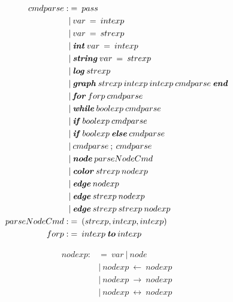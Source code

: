 \documentclass{article}
\begin{document}
\begin{align*}
    cmdparse :&= \: pass \\
    &| \: var \: = \: intexp \\
    &| \: var \: = \: strexp \\
    &| \: \textbf{\textit{int}} \: var \: = \: intexp \\
    &| \: \textbf{\textit{string}} \: var \: = \: strexp \\
    &| \: \textbf{\textit{log}} \: strexp \\
    &| \: \textbf{\textit{graph}} \: strexp \: intexp \: intexp \: cmdparse \: \textbf{\textit{end}}\\
    &| \: \textbf{\textit{for}} \: forp \: cmdparse \\
    &| \: \textbf{\textit{while}} \: boolexp \: cmdparse \\
    &| \: \textbf{\textit{if}} \: boolexp \: cmdparse \\
    &| \: \textbf{\textit{if}} \: boolexp \: \textbf{\textit{else}} \: cmdparse \\
    &| \: cmdparse \: ; \: cmdparse \\
    &| \: \textbf{\textit{node}} \: parseNodeCmd \\
    &| \: \textbf{\textit{color}} \: strexp \: nodexp \\
    &| \: \textbf{\textit{edge}} \: nodexp \\
    &| \: \textbf{\textit{edge}} \: strexp \: nodexp \\
    &| \: \textbf{\textit{edge}} \: strexp \: strexp \: nodexp \\
    parseNodeCmd :&= \: (strexp, intexp, intexp) \\
    forp :&= \: intexp \: \textbf{\textit{to}} \: intexp \\
\end{align*}

\begin{align*}
    nodexp :&= \: var \: | \: node \\ 
    &| \: nodexp \: \leftarrow \: nodexp \\
    &| \: nodexp \: \rightarrow \: nodexp \\
    &| \: nodexp \: \leftrightarrow \: nodexp \\
\end{align*}
\end{document}
